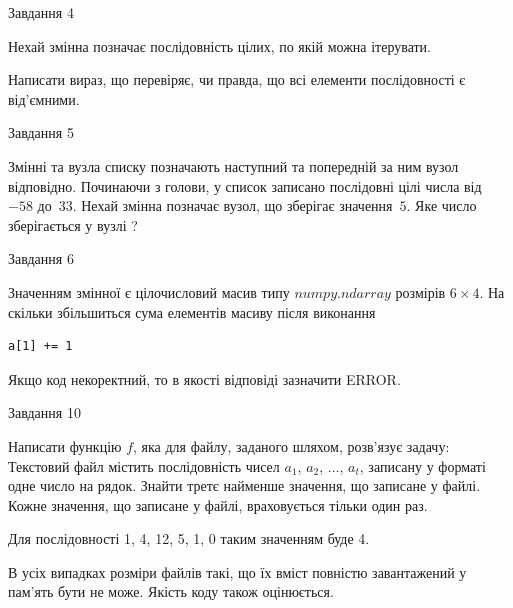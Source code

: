 \documentclass[12pt, ukrainian]{article}
\begin{document}
{               
{\begin{center}Завдання {4}\end{center}}
\vspace{-6mm}
Нехай змінна  позначає послідовність цілих, по якій можна ітерувати.

Написати вираз, що перевіряє, чи правда, що всі елементи послідовності є від’ємни\-ми.\par

\vspace{10mm}
               
{\begin{center}Завдання {5}\end{center}}
\vspace{-6mm}
Змінні  та  вузла списку позначають наступний та попередній за ним вузол відповідно. Починаючи з голови, у список записано послідовні цілі числа від~$-58$ до~$33$. Нехай змінна  позначає вузол, що зберігає значення~$5$.
Яке число зберігається у вузлі  ?\par

               
{\begin{center}Завдання {6}\end{center}}
\vspace{-6mm}
Значенням змінної  є цілочисловий масив типу $numpy.ndarray$ розмірів $6{\times}4$. На скільки збільшиться сума елементів масиву  після виконання
\begin{verbatim}
a[1] += 1
\end{verbatim}


Якщо код некоректний, то в якості відповіді зазначити ERROR.\par

               
{\begin{center}Завдання {10}\end{center}}
\vspace{-6mm}

Написати функцію $f$, яка для файлу, заданого шляхом, розв’язує задачу:\\ Текстовий файл містить послідовність чисел $a_1$, $a_2$, $\ldots$, $a_t$, записану у форматі одне число на рядок. Знайти третє найменше значення, що записане у файлі. Кожне значення, що записане у файлі, враховується тільки один раз. \par
Для послідовності 1, 4, 12, 5, 1, 0 таким значенням буде 4.

В усіх випадках розміри файлів такі, що їх вміст повністю завантажений у пам'ять бути не може. Якість коду також оцінюється.



}
\end{document}
